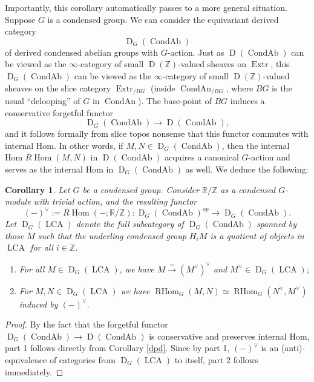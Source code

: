 \documentclass[12pt]{article}
\newtheorem{corollary}[theorem]{Corollary}
\theoremstyle{definition}
\newcommand{\on}{\operatorname}
\newcommand{\mbb}{\mathbb}
\newcommand{\ul}{\underline}
\begin{document}
Importantly, this corollary automatically passes to a more general situation.  Suppose $G$ is a condensed group.  We can consider the equivariant derived category
$$\on{D}_G(\on{CondAb})$$
of derived condensed abelian groups with $G$-action.  Just as $\on{D}(\on{CondAb})$ can be viewed as the $\infty$-category of small $\on{D}(\mbb{Z})$-valued sheaves on $\on{Extr}$, this $\on{D}_G(\on{CondAb})$ can be viewed as the $\infty$-category of small $\on{D}(\mbb{Z})$-valued sheaves on the slice category $\on{Extr}_{/BG}$ (inside $\on{CondAn}_{/BG}$, where $BG$ is the usual ``delooping'' of $G$ in $\on{CondAn}$).  The base-point of $BG$ induces a conservative forgetful functor
$$\on{D}_G(\on{CondAb}) \to \on{D}(\on{CondAb}),$$
and it follows formally from slice topos nonsense that this functor commutes with internal Hom.  In other words, if $M,N \in \on{D}_G(\on{CondAb})$, then the internal Hom $\ul{R\on{Hom}}(M,N)$
in $\on{D}(\on{CondAb})$ acquires a canonical $G$-action and serves as the internal Hom in $\on{D}_G(\on{CondAb})$ as well.  We deduce the following:

\begin{corollary}\label{equidpd}
Let $G$ be a condensed group.  Consider $\mbb{R}/\mbb{Z}$ as a condensed $G$-module with trivial action, and the resulting functor
$$(-)^\vee:= \ul{R\on{Hom}}(-;\mbb{R}/\mbb{Z}): \on{D}_G(\on{CondAb})^{op}\to \on{D}_G(\on{CondAb}).$$
Let $\on{D}_G(\on{LCA})$ denote the full subcategory of $\on{D}_G(\on{CondAb})$ spanned by those $M$ such that the underling condensed group $H_iM$ is a quotient of objects in $\on{LCA}$ for all $i\in \mbb{Z}$.

\begin{enumerate}
\item For all $M\in \on{D}_G(\on{LCA})$, we have $M\overset{\sim}{\rightarrow} (M^\vee)^\vee$ and $M^\vee\in \on{D}_G(\on{LCA})$;
\item For $M,N\in\on{D}_G(\on{LCA})$ we have $\on{RHom}_G(M,N) \simeq \on{RHom}_G(N^\vee,M^\vee)$ induced by $(-)^\vee$.
\end{enumerate}
\end{corollary}
\begin{proof}
By the fact that the forgetful functor $\on{D}_G(\on{CondAb})\to\on{D}(\on{CondAb})$ is conservative and preserves internal Hom, part 1 follows directly from Corollary \ref{dpd}.  Since by part 1, $(-)^\vee$ is an (anti)-equivalence of categories from $\on{D}_G(\on{LCA})$ to itself, part 2 follows immediately.
\end{proof}
\end{document}
